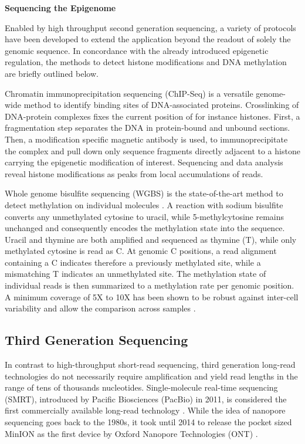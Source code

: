 \textbf{Sequencing the Epigenome}

Enabled by high throughput second generation sequencing, a variety of protocols have been developed to extend the application beyond the readout of solely the genomic sequence.
In concordance with the already introduced epigenetic regulation, the methods to detect histone modifications and DNA methylation are briefly outlined below.

Chromatin immunoprecipitation sequencing (ChIP-Seq) is a versatile genome-wide method to identify binding sites of DNA-associated proteins.
Crosslinking of DNA-protein complexes fixes the current position of for instance histones. 
First, a fragmentation step separates the DNA in protein-bound and unbound sections.
Then, a modification specific magnetic antibody is used, to immunoprecipitate the complex and pull down only sequence fragments directly adjacent to a histone carrying the epigenetic modification of interest.
Sequencing and data analysis reveal histone modifications as peaks from local accumulations of reads.

Whole genome bisulfite sequencing (WGBS) is the state-of-the-art method to detect methylation on individual molecules \cite{Frommer1992}.
A reaction with sodium bisulfite converts any unmethylated cytosine to uracil, while 5-methylcytosine remains unchanged and consequently encodes the methylation state into the sequence. 
Uracil and thymine are both amplified and sequenced as thymine (T), while only methylated cytosine is read as C.
At genomic C positions, a read alignment containing a C indicates therefore a previously methylated site, while a mismatching T indicates an unmethylated site.
The methylation state of individual reads is then summarized to a methylation rate per genomic position.
A minimum coverage of 5X to 10X has been shown to be robust against inter-cell variability and allow the comparison across samples \cite{Ziller2015}.




\subsection{Third Generation Sequencing}
\label{subsec:intro:tgs}

In contrast to high-throughput short-read sequencing, third generation long-read technologies do not necessarily require amplification and yield read lengths in the range of tens of thousands nucleotides. 
Single-molecule real-time sequencing (SMRT), introduced by Pacific Biosciences (PacBio) in 2011, is considered the first commercially available long-read technology \cite{Dijk2018}.
While the idea of nanopore sequencing goes back to the 1980s, it took until 2014 to release the pocket sized MinION as the first device by Oxford Nanopore Technologies (ONT) \cite{Deamer2016}.

